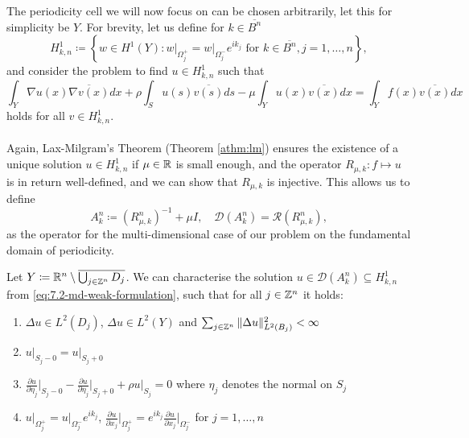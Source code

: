 The periodicity cell we will now focus on can be chosen arbitrarily, let this for simplicity be $Y$. For brevity, let us define for $k \in \overline{B^{n}}$ 
\[ H^{1}_{k, n} \coloneqq \left\{ w \in H^{1}(Y) \colon w \big|_{\Omega_{j}^{+}} = w \big|_{\Omega_{j}^{-}} e^{i k_{j}} \text{ for } k \in \overline{B^{n}}, j = 1,\dotsc, n \right\}, \]
 and consider the problem to find $u \in H^{1}_{k, n}$ such that
	\begin{equation}
		\int_{Y} \nabla u(x) \overline{\nabla v(x)} dx + \rho \int_{S} u(s) \overline{v(s)} ds - \mu \int_{Y} u(x) \overline{v(x)} dx = \int_{Y} f(x) \overline{v(x)} dx \label{eq:7.3-md_weak_formulation_res}
	\end{equation} 
holds for all $v \in H^{1}_{k, n}$. 
~\\ ~\\
Again, Lax-Milgram's Theorem (Theorem \ref{athm:lm}) ensures the existence of a unique solution $u \in H^{1}_{k, n}$ if $\mu \in \mathbb{R}$ is small enough, and the operator $R_{\mu, k} \colon f \mapsto u$ is in return well-defined, and we can show that $R_{\mu, k}$ is injective. This allows us to define 
	\[ A_{k}^{n} \coloneqq \left(R_{\mu, k}^{n}\right)^{-1} + \mu I, \quad \mathcal{D}(A_{k}^{n}) = \mathcal{R}(R_{\mu, k}^{n}), \]
as the operator for the multi-dimensional case of our problem on the fundamental domain of periodicity.
~\newpage
\begin{theorem} Let $Y \coloneqq \mathbb{R}^{n} \setminus \overline{\bigcup_{j \in \mathbb{Z}^{n}} D_{j}}$. We can characterise the solution $u \in \mathcal{D}(A^{n}_{k}) \subseteq H^{1}_{k, n}$ from \eqref{eq:7.2-md-weak-formulation}, such that for all $j \in \mathbb{Z}^{n}$ it holds:
	\begin{enumerate}[label=\alph*\upshape)]
		\item $\Delta u \in L^{2}(D_{j})$, $\Delta u \in L^{2}(Y)$ and $\sum_{j \in \mathbb{Z}^{n}} \|\Delta u \|_{L^{2}(B_{j})}^{2} < \infty$
		\item $u \big|_{S_{j} - 0} = u \big|_{S_{j} + 0}$
		\item $\frac{\partial u}{\partial \eta_{j}} \big|_{S_{j} - 0} - \frac{\partial u}{\partial \eta_{j}} \big|_{S_{j} + 0} + \rho u \big|_{S_{j}} = 0$ where $\eta_{j}$ denotes the normal on $S_{j}$
		\item $u \big|_{\Omega_{j}^{+}} = u \big|_{\Omega_{j}^{-}} e^{i k_{j}}$, $\frac{\partial u}{\partial x_{j}}\big|_{\Omega_{j}^{+}} = e^{ik_{j}} \frac{\partial u}{\partial x_{j}}\big|_{\Omega_{j}^{-}}$ for $j = 1, \dotsc, n $
	\end{enumerate}
\end{theorem}
	
